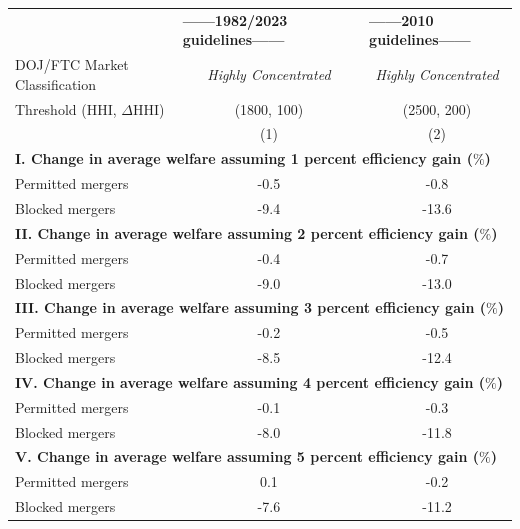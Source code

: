 \begin{tabular}{l @{\hspace{2em}} c @{\hspace{1.5em}}c}
\toprule
 & \multicolumn{1}{l}{\textbf{{------1982/2023 guidelines------ $\quad$ }}} & \multicolumn{1}{l}{\textbf{{------2010 guidelines------}}} \\ 
DOJ/FTC Market Classification & \textit{Highly Concentrated} & \textit{Highly Concentrated} \\ 
Threshold (HHI, $\Delta$HHI) & (1800, 100) & (2500, 200) \\ 
 & (1) & (2) \\ 
\midrule
\multicolumn{3}{l}{\textbf{I. Change in average welfare assuming 1 percent efficiency gain ($\%$)}} \\ 
Permitted mergers & -0.5 & -0.8 \\ 
Blocked mergers & -9.4 & -13.6 \\ 
\midrule
\multicolumn{3}{l}{\textbf{II. Change in average welfare assuming 2 percent efficiency gain ($\%$)}} \\ 
Permitted mergers & -0.4 & -0.7 \\ 
Blocked mergers & -9.0 & -13.0 \\ 
\midrule
\multicolumn{3}{l}{\textbf{III. Change in average welfare assuming 3 percent efficiency gain ($\%$)}} \\ 
Permitted mergers & -0.2 & -0.5 \\ 
Blocked mergers & -8.5 & -12.4 \\ 
\midrule
\multicolumn{3}{l}{\textbf{IV. Change in average welfare assuming 4 percent efficiency gain ($\%$)}} \\ 
Permitted mergers & -0.1 & -0.3 \\ 
Blocked mergers & -8.0 & -11.8 \\ 
\midrule
\multicolumn{3}{l}{\textbf{V. Change in average welfare assuming 5 percent efficiency gain ($\%$)}} \\ 
Permitted mergers & 0.1 & -0.2 \\ 
Blocked mergers & -7.6 & -11.2 \\ 
\bottomrule 
\end{tabular}